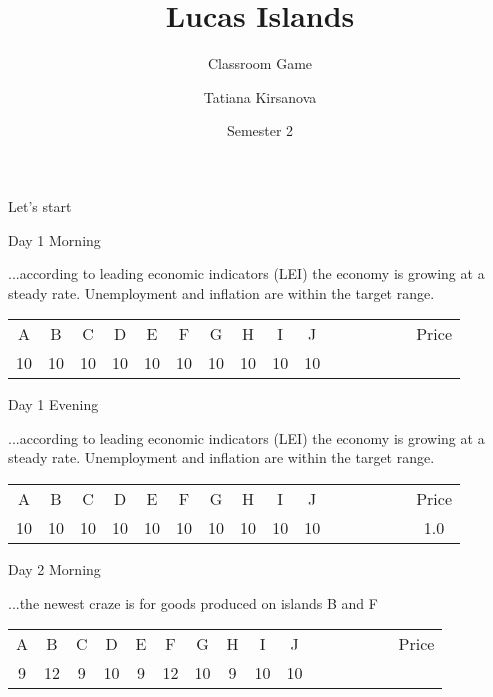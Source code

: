\documentclass[notes=show]{beamer}
\begin{document}
\title[Lucas Islands]{Lucas Islands}
\subtitle{Classroom Game}
\author[T. Kirsanova]{Tatiana Kirsanova}
\date{Semester 2}
\maketitle

\begin{frame}%

\begin{center}
{\LARGE Let's start}
\end{center}
\end{frame}%



\begin{frame}{Day 1 Morning}

\qquad ...according to leading economic indicators (LEI) the economy is
growing at a steady rate. Unemployment and inflation are within the target
range.

\bigskip

\begin{center}
\begin{tabular}{cccccccccccccccc}
A & B & C & D & E & F & G & H & I & J &  &  &  &  &  & Price \\ 
10 & 10 & 10 & 10 & 10 & 10 & 10 & 10 & 10 & 10 &  &  &  &  &  & 
\end{tabular}
\end{center}
\end{frame}%

\begin{frame}{Day 1 Evening}

\qquad ...according to leading economic indicators (LEI) the economy is
growing at a steady rate. Unemployment and inflation are within the target
range.

\bigskip

\begin{center}
\begin{tabular}{cccccccccccccccc}
A & B & C & D & E & F & G & H & I & J &  &  &  &  &  & Price \\ 
10 & 10 & 10 & 10 & 10 & 10 & 10 & 10 & 10 & 10 &  &  &  &  &  & 1.0%
\end{tabular}
\end{center}
\end{frame}%


\begin{frame}{Day 2 Morning}

\qquad ...the newest craze is for goods produced on islands B and F

\bigskip

\begin{center}
\begin{tabular}{cccccccccccccccc}
A & B & C & D & E & F & G & H & I & J &  &  &  &  &  & Price \\ 
9 & 12 & 9 & 10 & 9 & 12 & 10 & 9 & 10 & 10 &  &  &  &  &  & 
\end{tabular}
\end{center}

\end{frame}%
\end{document}

